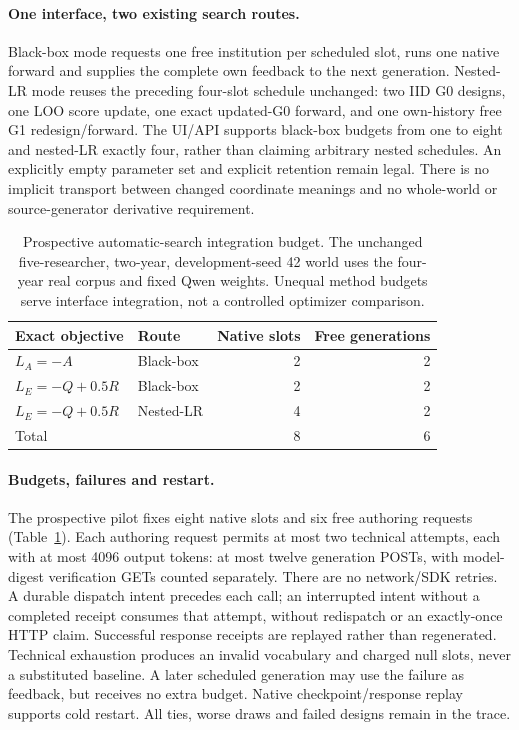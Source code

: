 \paragraph{One interface, two existing search routes.}
Black-box mode requests one free institution per scheduled slot, runs one
native forward and supplies the complete own feedback to the next generation.
Nested-LR mode reuses the preceding four-slot schedule unchanged: two IID
G0 designs, one LOO score update, one exact updated-G0 forward, and one
own-history free G1 redesign/forward. The UI/API supports black-box budgets
from one to eight and nested-LR exactly four, rather than claiming arbitrary
nested schedules. An explicitly empty parameter set and explicit retention
remain legal. There is no implicit transport between changed coordinate
meanings and no whole-world or source-generator derivative requirement.

\begin{table}[t]
\centering
\small
\begin{tabular}{llrr}
\toprule
Exact objective & Route & Native slots & Free generations \\
\midrule
$L_A=-A$ & Black-box & 2 & 2 \\
$L_E=-Q+0.5R$ & Black-box & 2 & 2 \\
$L_E=-Q+0.5R$ & Nested-LR & 4 & 2 \\
\midrule
Total & & 8 & 6 \\
\bottomrule
\end{tabular}
\caption{Prospective automatic-search integration budget. The unchanged
five-researcher, two-year, development-seed 42 world uses the four-year real
corpus and fixed Qwen weights. Unequal method budgets serve interface
integration, not a controlled optimizer comparison.}
\label{tab:automatic-budget-v14}
\end{table}

\paragraph{Budgets, failures and restart.}
The prospective pilot fixes eight native slots and six free authoring requests
(Table~\ref{tab:automatic-budget-v14}). Each authoring request permits at most
two technical attempts, each with at most 4096 output tokens: at most twelve
generation POSTs, with model-digest verification GETs counted separately.
There are no network/SDK retries. A durable dispatch intent precedes each call;
an interrupted intent without a completed receipt consumes that attempt,
without redispatch or an exactly-once HTTP claim. Successful response receipts
are replayed rather than regenerated. Technical exhaustion produces an invalid
vocabulary and charged null slots, never a substituted baseline. A later
scheduled generation may use the failure as feedback, but receives no extra
budget. Native checkpoint/response replay supports cold restart. All ties,
worse draws and failed designs remain in the trace.

